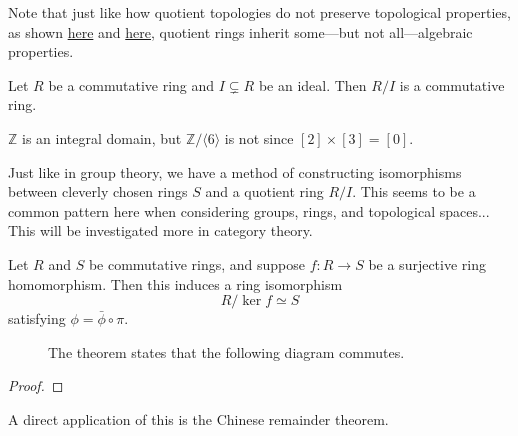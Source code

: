   Note that just like how quotient topologies do not preserve topological properties, as shown \hyperref[pst-quotient_trivial]{here} and \hyperref[pst-quotient_hausdorff]{here}, quotient rings inherit some---but not all---algebraic properties. 

  \begin{theorem}
    Let $R$ be a commutative ring and $I \subsetneq R$ be an ideal. Then $R/I$ is a commutative ring. 
  \end{theorem}

  \begin{example}
    $\mathbb{Z}$ is an integral domain, but $\mathbb{Z}/\langle 6 \rangle$ is not since $[2] \times [3] = [0]$. 
  \end{example}

  Just like in group theory, we have a method of constructing isomorphisms between cleverly chosen rings $S$ and a quotient ring $R/I$. This seems to be a common pattern here when considering groups, rings, and topological spaces... This will be investigated more in category theory. 

  \begin{theorem}
    Let $R$ and $S$ be commutative rings, and suppose $f: R \rightarrow S$ be a surjective ring homomorphism. Then this induces a ring isomorphism
    \begin{equation}
      R /\ker{f} \simeq S
    \end{equation} 
    satisfying $\phi = \bar{\phi} \circ \pi$. 

    \begin{figure}[H]
      \centering 
      \caption{The theorem states that the following diagram commutes. } 
      \label{fig:fund_ring_homo_theorem}
    \end{figure}
  \end{theorem}
  \begin{proof}
    
  \end{proof} 

  A direct application of this is the Chinese remainder theorem. 

